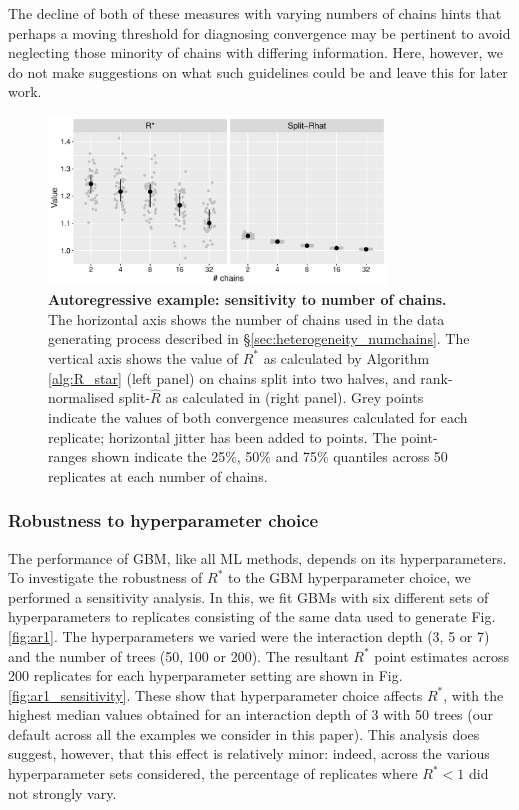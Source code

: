 \documentclass{article}
\begin{document}
The decline of both of these measures with varying numbers of chains hints that perhaps a moving threshold for diagnosing convergence may be pertinent to avoid neglecting those minority of chains with differing information. Here, however, we do not make suggestions on what such guidelines could be and leave this for later work.

\begin{figure}[!htb]
	\centerline{\includegraphics[width=0.8\textwidth]{../output/ar1_numchains.pdf}}
	\caption{\textbf{Autoregressive example: sensitivity to number of chains.} The horizontal axis shows the number of chains used in the data generating process described in \S\ref{sec:heterogeneity_numchains}. The vertical axis shows the value of $R^*$ as calculated by Algorithm \ref{alg:R_star} (left panel) on chains split into two halves, and rank-normalised split-$\widehat{R}$ as calculated in \cite{vehtari2019rank} (right panel). Grey points indicate the values of both convergence measures calculated for each replicate; horizontal jitter has been added to points. The point-ranges shown indicate the 25\%, 50\% and 75\% quantiles across 50 replicates at each number of chains.}
	\label{fig:ar1_numchains}
\end{figure}

\subsubsection{Robustness to hyperparameter choice}\label{sec:heterogeneity_robustness}
The performance of GBM, like all ML methods, depends on its hyperparameters. To investigate the robustness of $R^*$ to the GBM hyperparameter choice, we performed a sensitivity analysis. In this, we fit GBMs with six different sets of hyperparameters to replicates consisting of the same data used to generate Fig. \ref{fig:ar1}. The hyperparameters we varied were the interaction depth (3, 5 or 7) and the number of trees (50, 100 or 200). The resultant $R^*$ point estimates across 200 replicates for each hyperparameter setting are shown in Fig. \ref{fig:ar1_sensitivity}. These show that hyperparameter choice affects $R^*$, with the highest median values obtained for an interaction depth of 3 with 50 trees (our default across all the examples we consider in this paper). This analysis does suggest, however, that this effect is relatively minor: indeed, across the various hyperparameter sets considered, the percentage of replicates where $R^*<1$ did not strongly vary.
\end{document}
